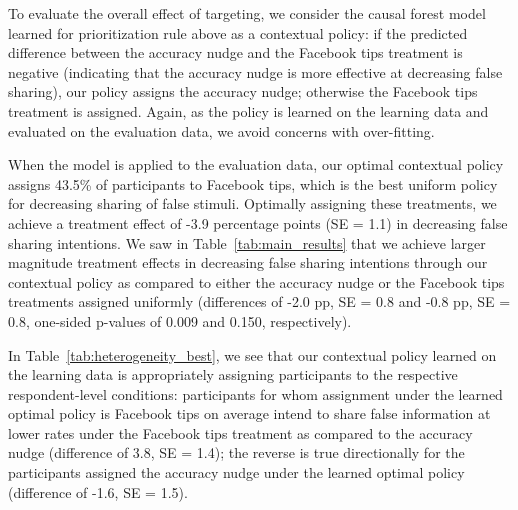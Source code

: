 \documentclass[letterpaper, 12pt, parskip=full,DIV=10]{scrartcl}
\begin{document}
To evaluate the overall effect of targeting, we consider the causal forest model learned for prioritization rule above as a contextual policy: if the predicted difference between the accuracy nudge and the Facebook tips treatment is negative (indicating that the accuracy nudge is more effective at decreasing false sharing), our policy assigns the accuracy nudge; otherwise the Facebook tips treatment is assigned. Again, as the policy is learned on the learning data and evaluated on the evaluation data, we avoid concerns with over-fitting.  

When the model is applied to the evaluation data, our optimal contextual policy assigns 43.5\% of participants to Facebook tips, which is the best uniform policy for decreasing sharing of false stimuli. Optimally assigning these treatments, we achieve a treatment effect of -3.9 percentage points (SE = 1.1) in decreasing false sharing intentions.  We saw in Table~\ref{tab:main_results} that we achieve larger magnitude treatment effects in decreasing false sharing intentions through our contextual policy as compared to either the accuracy nudge or the Facebook tips treatments assigned uniformly (differences of -2.0 pp, SE = 0.8 and -0.8 pp, SE = 0.8, one-sided p-values of 0.009 and 0.150, respectively). %

In Table~\ref{tab:heterogeneity_best}, we see that our contextual policy learned on the learning data is appropriately assigning participants to the respective respondent-level conditions: participants for whom assignment under the learned optimal policy is Facebook tips on average intend to share false information at lower rates under the Facebook tips treatment as compared to the accuracy nudge (difference of 3.8, SE = 1.4); the reverse is true directionally for the participants assigned the accuracy nudge under the learned optimal policy (difference of -1.6, SE = 1.5).  
\end{document}

